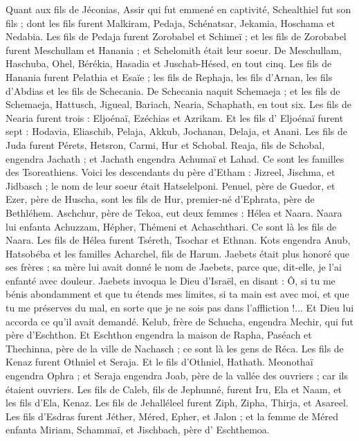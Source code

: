 \begin{multicols}{2}
Quant aux fils de Jéconias, Assir qui fut emmené en captivité, Schealthiel fut son fils ;
dont les fils furent Malkiram, Pedaja, Schénatsar, Jekamia, Hoschama et Nedabia.
Les fils de Pedaja furent Zorobabel et Schimeï ; et les fils de Zorobabel furent Meschullam et Hanania ; et Schelomith était leur soeur.
De Meschullam, Haschuba, Ohel, Bérékia, Hasadia et Juschab-Hésed, en tout cinq.
Les fils de Hanania furent  Pelathia et Esaïe ; les fils de Rephaja, les fils d'Arnan, les fils d’Abdias et les fils de Schecania.
De Schecania naquit Schemaeja ; et les fils de Schemaeja, Hattusch, Jigueal, Bariach, Nearia, Schaphath, en tout six.
Les fils de Nearia furent trois : Eljoénaï, Ezéchias et Azrikam.
Et les fils d' Eljoénaï furent  sept : Hodavia, Eliaschib, Pelaja, Akkub, Jochanan, Delaja, et Anani.
\VerseOne{}Les fils de Juda furent Pérets, Hetsron, Carmi, Hur et Schobal.
Reaja, fils de Schobal, engendra Jachath ; et Jachath engendra Achumaï et Lahad. Ce sont les familles des Tsoreathiens.
Voici les descendants du père d’Etham : Jizreel, Jischma, et Jidbasch ; le nom de leur soeur était Hatselelponi.
Penuel, père de Guedor, et Ezer, père de Huscha, sont les fils de Hur, premier-né d'Ephrata, père de Bethléhem.
Aschchur, père de Tekoa, eut deux femmes : Hélea et Naara.
Naara lui enfanta Achuzzam, Hépher, Thémeni et Achaschthari. Ce sont là les fils de Naara.
Les fils de Hélea furent Tséreth, Tsochar et Ethnan.
Kots engendra Anub, Hatsobéba et les familles Acharchel, fils de Harum.
Jaebets était plus honoré que ses frères ; sa mère lui avait donné le nom de Jaebets, parce que, dit-elle, je l'ai enfanté avec douleur.
Jaebets invoqua le Dieu d'Israël, en disant : Ô, si tu me bénis abondamment et que tu étends mes limites, si ta main est avec moi, et que tu me préserves du mal, en sorte que je ne sois pas dans l’affliction !... Et Dieu lui accorda ce qu'il avait demandé.
Kelub, frère de Schucha, engendra Mechir, qui fut père d'Eschthon.
Et Eschthon engendra la maison de Rapha, Paséach et Thechinna, père de la ville de Nachasch ; ce sont là les gens de Réca.
Les fils de Kenaz furent Othniel et Seraja. Et le fils d’Othniel, Hathath.
Meonothaï engendra Ophra ; et Seraja engendra Joab, père de la vallée des ouvriers ; car ils étaient ouvriers.
Les fils de Caleb, fils de Jephunné, furent Iru, Ela et Naam, et les fils d'Ela, Kenaz.
Les fils de Jehalléleel furent Ziph, Zipha, Thirja, et Asareel.
Les fils d'Esdras furent Jéther, Méred, Epher, et Jalon ; et la femme de Méred enfanta Miriam, Schammaï, et Jischbach, père d' Eschthemoa.

\end{multicols}

